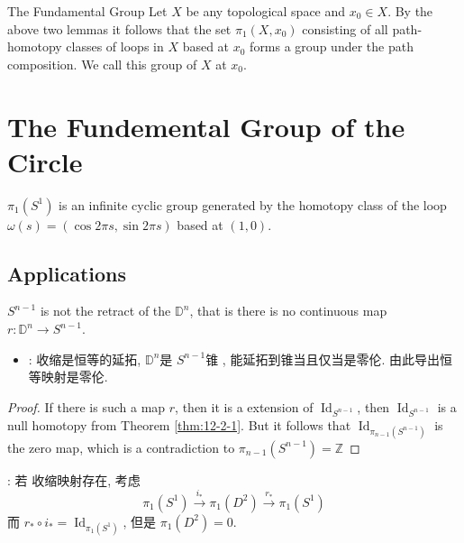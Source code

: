\documentclass[../main.tex]{subfiles}
\begin{document}
\begin{definition}{The Fundamental Group}{}
Let $X$ be any topological space and $x_0 \in X$. By the above two lemmas it follows that the set $\pi_1(X, x_0)$ consisting of all path-homotopy classes of loops in $X$ based at $x_0$ forms a group under the path composition. We call this group  of $X$ at $x_0$.
\end{definition}


\section{The Fundemental Group of the Circle}
\begin{theorem}{}{}
\(\pi_{1}(S^{1})\) is an infinite cyclic group generated by the homotopy class of the loop \(\omega(s) = (\cos 2\pi s, \sin 2\pi s)\) based at \((1,0)\).
\end{theorem}
\subsection*{Applications}
\begin{lemma}{}{}
    \(  S^{n-1}  \) is not the retract of the \(  \mathbb{D}^{n}  \), that is there is no continuous map \(  r: \mathbb{D}^{n}\to S^{n-1}  \).   
\end{lemma}

\begin{proofsketch}
   \begin{itemize}
    \item  {}: 收缩是恒等的延拓, \(  \mathbb{D}^{n}  \)是 \(  S^{n-1}  \)锥 , 能延拓到锥当且仅当是零伦. 由此导出恒等映射是零伦.  
   \end{itemize}
   
\end{proofsketch}


\begin{proof}
    If there is such a map \(  r  \), then it is a extension of \(  \operatorname{Id}_{S^{n-1}}  \), then \(  \operatorname{Id}_{S^{n-1}}  \) is a null homotopy from Theorem \ref{thm:12-2-1}. But it follows that \(  \operatorname{Id}_{ \pi _{n-1} \left( S^{n-1} \right) }  \)   is the zero map, which is a contradiction to \(   \pi _{n-1} \left( S^{n-1} \right)= \mathbb{Z}    \) 
\end{proof}

\begin{proofsketch}
    :   若 收缩映射存在, 考虑\[
     \pi_1(S^1) \xrightarrow{i_*} \pi_1(D^2) \xrightarrow{r_*} \pi_1(S^1)
    \]而 \(  r_{*}\circ i_{*}= \operatorname{Id}_{ \pi _1 \left( S^{1} \right) }  \),  但是 \(   \pi _1 \left( D^{2} \right)= 0   \). 
\end{proofsketch}
\end{document}
